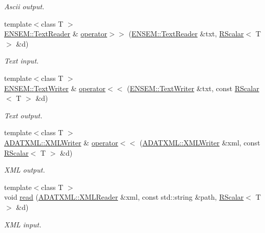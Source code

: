 \begin{DoxyCompactItemize}
\begin{DoxyCompactList}\small\item\em Ascii output. \end{DoxyCompactList}\item 
{\footnotesize template$<$class T $>$ }\\\mbox{\hyperlink{classENSEM_1_1TextReader}{E\+N\+S\+E\+M\+::\+Text\+Reader}} \& \mbox{\hyperlink{group__rscalar_ga4ebc0db18feecd564535eb9b6011c854}{operator$>$$>$}} (\mbox{\hyperlink{classENSEM_1_1TextReader}{E\+N\+S\+E\+M\+::\+Text\+Reader}} \&txt, \mbox{\hyperlink{classENSEM_1_1RScalar}{R\+Scalar}}$<$ T $>$ \&d)
\begin{DoxyCompactList}\small\item\em Text input. \end{DoxyCompactList}\item 
{\footnotesize template$<$class T $>$ }\\\mbox{\hyperlink{classENSEM_1_1TextWriter}{E\+N\+S\+E\+M\+::\+Text\+Writer}} \& \mbox{\hyperlink{group__rscalar_ga1b0ef216d273bb97e82fce8f99467105}{operator$<$$<$}} (\mbox{\hyperlink{classENSEM_1_1TextWriter}{E\+N\+S\+E\+M\+::\+Text\+Writer}} \&txt, const \mbox{\hyperlink{classENSEM_1_1RScalar}{R\+Scalar}}$<$ T $>$ \&d)
\begin{DoxyCompactList}\small\item\em Text output. \end{DoxyCompactList}\item 
{\footnotesize template$<$class T $>$ }\\\mbox{\hyperlink{classADATXML_1_1XMLWriter}{A\+D\+A\+T\+X\+M\+L\+::\+X\+M\+L\+Writer}} \& \mbox{\hyperlink{group__rscalar_ga73069f4953b3397b5fbd94f9b78203fa}{operator$<$$<$}} (\mbox{\hyperlink{classADATXML_1_1XMLWriter}{A\+D\+A\+T\+X\+M\+L\+::\+X\+M\+L\+Writer}} \&xml, const \mbox{\hyperlink{classENSEM_1_1RScalar}{R\+Scalar}}$<$ T $>$ \&d)
\begin{DoxyCompactList}\small\item\em X\+ML output. \end{DoxyCompactList}\item 
{\footnotesize template$<$class T $>$ }\\void \mbox{\hyperlink{group__rscalar_ga254ddc2517282f105035865bc1e227dc}{read}} (\mbox{\hyperlink{classADATXML_1_1XMLReader}{A\+D\+A\+T\+X\+M\+L\+::\+X\+M\+L\+Reader}} \&xml, const std\+::string \&path, \mbox{\hyperlink{classENSEM_1_1RScalar}{R\+Scalar}}$<$ T $>$ \&d)
\begin{DoxyCompactList}\small\item\em X\+ML input. \end{DoxyCompactList}\item 

\end{DoxyCompactItemize}
